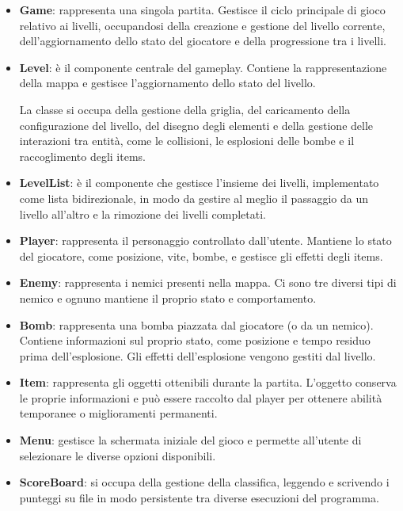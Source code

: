\documentclass[a4paper,11pt]{article}
\begin{document}
\begin{itemize}

    \item \textbf{Game}: rappresenta una singola partita. Gestisce il ciclo
    principale di gioco relativo ai livelli, occupandosi della creazione e
    gestione del livello corrente, dell'aggiornamento dello stato del giocatore
    e della progressione tra i livelli.

    \item \textbf{Level}: è il componente centrale del gameplay. Contiene la
    rappresentazione della mappa e gestisce l'aggiornamento dello stato del
    livello.

    La classe si occupa della gestione della griglia, del caricamento della
    configurazione del livello, del disegno degli elementi e della gestione
    delle interazioni tra entità, come le collisioni, le esplosioni delle bombe
    e il raccoglimento degli items.

    \item \textbf{LevelList}: è il componente che gestisce l'insieme dei livelli, implementato 
    come lista bidirezionale, in modo da gestire al meglio il passaggio da un livello all'altro
    e la rimozione dei livelli completati.

    \item \textbf{Player}: rappresenta il personaggio controllato dall'utente.
    Mantiene lo stato del giocatore, come posizione, vite, bombe, e gestisce gli 
    effetti degli items.

    \item \textbf{Enemy}: rappresenta i nemici presenti nella mappa. Ci sono tre
    diversi tipi di nemico e ognuno mantiene il proprio stato e comportamento.

    \item \textbf{Bomb}: rappresenta una bomba piazzata dal giocatore (o da un nemico).
    Contiene informazioni sul proprio stato, come posizione e tempo residuo
    prima dell'esplosione. Gli effetti dell'esplosione vengono gestiti dal
    livello.

    \item \textbf{Item}: rappresenta gli oggetti ottenibili durante la partita.
    L'oggetto conserva le proprie informazioni e può essere raccolto dal player
    per ottenere abilità temporanee o miglioramenti permanenti.

    \item \textbf{Menu}: gestisce la schermata iniziale del gioco e permette
    all'utente di selezionare le diverse opzioni disponibili.

    \item \textbf{ScoreBoard}: si occupa della gestione della classifica,
    leggendo e scrivendo i punteggi su file in modo persistente tra diverse
    esecuzioni del programma.

\end{itemize}
\end{document}
